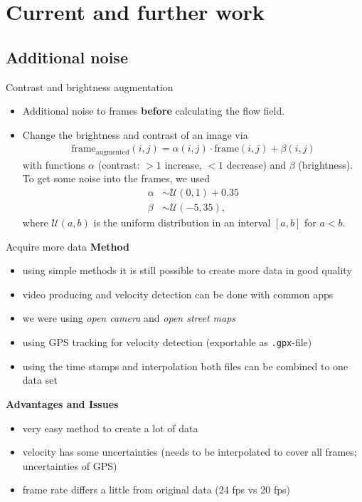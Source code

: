 \section{Current and further work}
\subsection{Additional noise}
\begin{frame}{Contrast and brightness augmentation}
\begin{itemize}
\item Additional noise to frames \textbf{before} calculating the flow field.
\item Change the brightness and contrast of an image via
\begin{align*}
\text{frame}_{\mathrm{augmented}}(i,j) = \alpha(i,j) \cdot \text{frame}(i,j) + \beta(i,j)
\end{align*}
with functions $\alpha$ (contrast: $>1$ increase, $<1$ decrease) and $\beta$ (brightness).\\
To get some noise into the frames, we used
\begin{align*}
\alpha &\sim \mathcal{U}(0,1)+0.35\\
\beta &\sim \mathcal{U}(-5,35),
\end{align*}
where $\mathcal{U}(a,b)$ is the uniform distribution in an interval $[a,b]$ for $a < b$.
\end{itemize}
\end{frame}

\begin{frame}{Acquire more data}
	\textbf{Method}
	\begin{itemize}
		\item using simple methods it is still possible to create more data in good quality
		\item video producing and velocity detection can be done with common apps
		\item we were using \textit{open camera} and \textit{open street maps}
		\item using GPS tracking for velocity detection (exportable as \texttt{.gpx}-file)
		\item using the time stamps and interpolation both files can be combined to one data set
	\end{itemize}
	\textbf{Advantages and Issues}
	\begin{itemize}
		\item very easy method to create a lot of data
		\item velocity has some uncertainties (needs to be interpolated to cover all frames; uncertainties of GPS)
		\item frame rate differs a little from original data (24 fps vs 20 fps)
	\end{itemize}
\end{frame}

